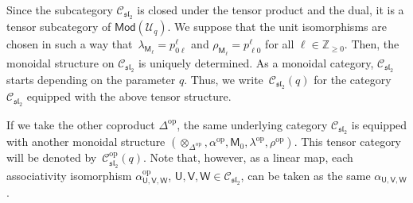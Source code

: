 \documentclass[pdftex]{sigma}
\numberwithin{equation}{section}
\newcommand{\catMod}{\mathsf{Mod}}
\newcommand{\op}{\mathrm{op}}
\newcommand{\bZ}{\mathbb{Z}}
\newcommand{\cC}{\mathcal{C}}
\newcommand{\cU}{\mathcal{U}}
\newcommand{\fsl}{\mathfrak{sl}}
\newcommand{\sfM}{\mathsf{M}}
\newcommand{\sfU}{\mathsf{U}}
\newcommand{\sfV}{\mathsf{V}}
\newcommand{\sfW}{\mathsf{W}}
\newcommand{\UEA}{\cU}
\newcommand{\Uq}{\UEA_{q}}
\newcommand{\QGirrep}[1]{\sfM_{#1}}
\newcommand{\QGcoprod}{\Delta}
\newcommand{\CGproj}[3]{p^{#1}_{#2 #3}}
\newcommand{\catQG}{\cC_{\fsl_{2}}}
\newcommand{\QGrepU}{\sfU}
\newcommand{\QGrepV}{\sfV}
\newcommand{\QGrepW}{\sfW}
\begin{document}
Since the subcategory $\catQG$ is closed under the tensor product and the dual, it is a tensor subcategory of $\catMod (\Uq)$.
We suppose that the unit isomorphisms are chosen in such a way that~${\lambda_{\QGirrep{\ell}}=\CGproj{\ell}{0}{\ell}}$ and $\rho_{\QGirrep{\ell}}=\CGproj{\ell}{\ell}{0}$ for all $\ell\in\bZ_{\geq 0}$.
Then, the monoidal structure on $\catQG$ is uniquely determined.
As a monoidal category, $\catQG$ starts depending on the parameter $q$.
Thus, we write~$\catQG (q)$ for the category $\catQG$ equipped with the above tensor structure.

If we take the other coproduct $\QGcoprod^{\op}$, the same underlying category $\catQG$ is equipped with another monoidal structure $(\otimes_{\QGcoprod^{\op}},\alpha^{\op},\QGirrep{0},\lambda^{\op},\rho^{\op})$.
This tensor category will be denoted by~$\catQG^{\op}(q)$.
Note that, however, as a linear map, each associativity isomorphism $\alpha^{\op}_{\QGrepU,\QGrepV,\QGrepW}$, $\QGrepU,\QGrepV,\QGrepW\in \catQG$, can be taken as the same $\alpha_{\QGrepU,\QGrepV,\QGrepW}$.
\end{document}
